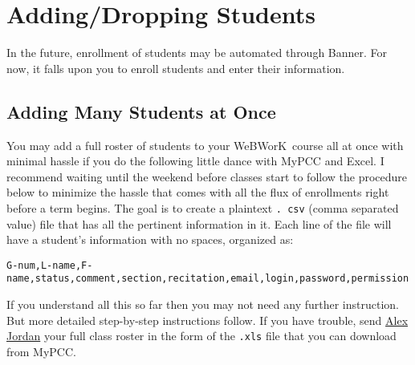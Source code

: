 \documentclass[12pt]{article}
\newcommand{\WW}{WeBWorK}
\begin{document}
\section{Adding/Dropping Students}
In the future, enrollment of students may be automated through Banner.
For now, it falls upon you to enroll students and enter their information.

\subsection{Adding Many Students at Once}
You may add a full roster of students to your \WW\ course all at once with minimal hassle if you do the following little dance with MyPCC and Excel.
I recommend waiting until the weekend before classes start to follow the procedure below to minimize the hassle that comes with all the flux of enrollments right before a term begins.
The goal is to create a plaintext \texttt{.
	csv} (comma separated value) file that has all the pertinent information in it.
Each line of the file will have a student's information with no spaces, organized as:\\

\small \centerline{\texttt{G-num,L-name,F-name,status,comment,section,recitation,email,login,password,permission}} \normalsize \vspace{1pc}

If you understand all this so far then you may not need any further instruction.
But more detailed step-by-step instructions follow.
If you have trouble, send \href{mailto:alex.
	jordan@pcc.edu}{Alex Jordan} your full class roster in the form of the \texttt{.xls} file that you can download from MyPCC.
\end{document}
